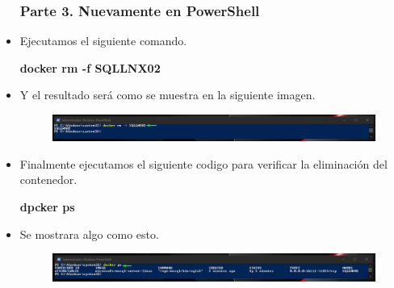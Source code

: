 \begin{itemize}
				\subsubsection{Parte 3. Nuevamente en PowerShell}
					\item Ejecutamos el siguiente comando.
						\begin{center}
							\textbf{docker rm -f SQLLNX02} \\
						\end{center}
					\item Y el resultado será como se muestra en la siguiente imagen.
						\begin{figure}[htb]						
							\begin{center}
								\includegraphics[width=19cm]{./Imagenes/Comando012}
							\end{center}
						\end{figure}
					\item Finalmente ejecutamos el siguiente codigo para verificar la eliminación del contenedor.
						\begin{center}
							\textbf{dpcker ps} \\
						\end{center}
					\item Se mostrara algo como esto.
						\begin{figure}[htb]
							\begin{center}
								\includegraphics[width=19cm]{./Imagenes/Comando013}
							\end{center}
						\end{figure}

\end{itemize}
